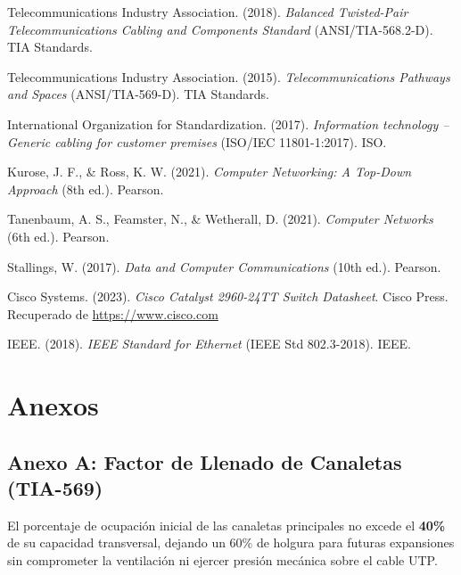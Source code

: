 \documentclass[12pt,a4paper]{article}
\begin{document}
\begin{enumerate}[leftmargin=1.8em,itemsep=4pt,label={[\arabic*]}]
  \item Telecommunications Industry Association. (2018). \textit{Balanced Twisted-Pair Telecommunications Cabling and Components Standard} (ANSI/TIA-568.2-D). TIA Standards.

  \item Telecommunications Industry Association. (2015). \textit{Telecommunications Pathways and Spaces} (ANSI/TIA-569-D). TIA Standards.

  \item International Organization for Standardization. (2017). \textit{Information technology -- Generic cabling for customer premises} (ISO/IEC 11801-1:2017). ISO.

  \item Kurose, J. F., \& Ross, K. W. (2021). \textit{Computer Networking: A Top-Down Approach} (8th ed.). Pearson.

  \item Tanenbaum, A. S., Feamster, N., \& Wetherall, D. (2021). \textit{Computer Networks} (6th ed.). Pearson.

  \item Stallings, W. (2017). \textit{Data and Computer Communications} (10th ed.). Pearson.

  \item Cisco Systems. (2023). \textit{Cisco Catalyst 2960-24TT Switch Datasheet}. Cisco Press. Recuperado de \url{https://www.cisco.com}

  \item IEEE. (2018). \textit{IEEE Standard for Ethernet} (IEEE Std 802.3-2018). IEEE.
\end{enumerate}

\section{Anexos}

\subsection{Anexo A: Factor de Llenado de Canaletas (TIA-569)}
El porcentaje de ocupación inicial de las canaletas principales no excede el \textbf{40\%} de su capacidad transversal, dejando un 60\% de holgura para futuras expansiones sin comprometer la ventilación ni ejercer presión mecánica sobre el cable UTP.
\end{document}
